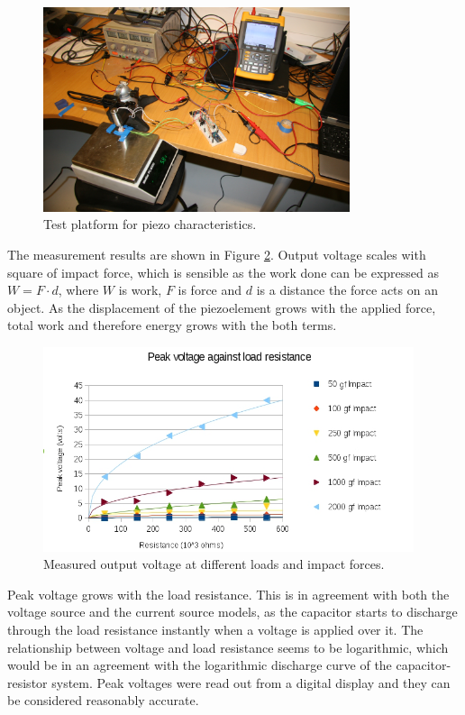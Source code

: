 \begin{figure}[htb]
  \begin{center}
  \includegraphics[height=6cm]{images/own_pic/piezo_test}
  \end{center}
  \caption{Test platform for piezo characteristics.}
  \label{fiq:piezo_impact}
\end{figure}

The measurement results are shown in Figure \ref{fiq:piezo_measurement_chart}. Output voltage scales with square of impact force, which is sensible as the work done can be expressed as $W = F \cdot d$, where $W$ is work, $F$ is force and $d$ is a distance the force acts on an object. As the displacement of the piezoelement grows with the applied force, total work and therefore energy grows with the both terms. 

\begin{figure}[htb]
  \begin{center}
  \includegraphics[height=6cm]{images/own_measurement/piezo_measurements}
  \end{center}
  \caption{Measured output voltage at different loads and impact forces.}
  \label{fiq:piezo_measurement_chart}
\end{figure}

Peak voltage grows with the load resistance. This is in agreement with both the voltage source and the current source models, as the capacitor starts to discharge through the load resistance instantly when a voltage is applied over it. The relationship between voltage and load resistance seems to be logarithmic, which would be in an agreement with the logarithmic discharge curve of the capacitor-resistor system. Peak voltages were read out from a digital display and they can be considered reasonably accurate.


